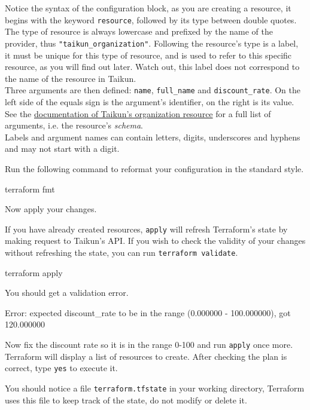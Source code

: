 \begin{tip}
Notice the syntax of the configuration block, as you are creating a resource,
it begins with the keyword \texttt{resource}, followed by its type between double quotes.
The type of resource is always lowercase and prefixed by the name of the provider,
thus \texttt{"taikun\_organization"}.
Following the resource's type is a label, it must be unique for this type of resource, and is used
to refer to this specific resource, as you will find out later.
Watch out, this label does not correspond to the name of the resource in Taikun.\\

Three arguments are then defined: \texttt{name}, \texttt{full\_name} and \texttt{discount\_rate}.
On the left side of the equals sign is the argument's identifier, on the right is its value.
See the
  \href{https://registry.terraform.io/providers/itera-io/taikun/latest/docs/resources/organization}{documentation
  of Taikun's organization resource} for a full list of arguments, i.e. the
  resource's \textit{schema}.\\

Labels and argument names can contain letters, digits, underscores and hyphens and may not start with a digit.
\end{tip}
Run the following command to reformat your configuration in the standard style.
\begin{shell}
terraform fmt
\end{shell}
Now apply your changes.
\begin{tip}
If you have already created resources, \texttt{apply} will refresh Terraform's state
by making request to Taikun's API. If you wish to check the validity of your changes
without refreshing the state, you can run \texttt{terraform validate}.
\end{tip}
\begin{shell}
terraform apply
\end{shell}
You should get a validation error.
\begin{raw}
Error: expected discount_rate to be in the range (0.000000 - 100.000000), got 120.000000
\end{raw}
Now fix the discount rate so it is in the range 0-100 and run \texttt{apply} once more.
Terraform will display a list of resources to create.
After checking the plan is correct, type \texttt{yes} to execute it.
\begin{tip}
You should notice a file \texttt{terraform.tfstate} in your working directory,
Terraform uses this file to keep track of the state, do not modify or delete it.
\end{tip}
